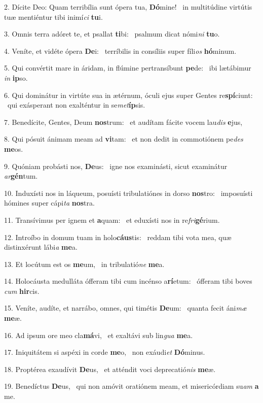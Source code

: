 2. Dícite Deo: Quam terribília sunt ópera tua, \textbf{Dó}mine! \ast\  in multitúdine virtútis tuæ mentiéntur tibi inimí\textit{ci} \textbf{tu}i.\

3. Omnis terra adóret te, et psallat \textbf{ti}bi: \ast\  psalmum dicat nómi\textit{ni} \textbf{tu}o.\

4. Veníte, et vidéte ópera \textbf{De}i: \ast\  terríbilis in consíliis super fíli\textit{os} \textbf{hó}minum.\

5. Qui convértit mare in áridam, in flúmine pertransíbunt \textbf{pe}de: \ast\  ibi lætábimur \textit{in} \textbf{ip}so.\

6. Qui dominátur in virtúte sua in ætérnum, óculi ejus super Gentes re\textbf{spí}ciunt: \ast\  qui exásperant non exalténtur in se\textit{met}\textbf{íp}sis.\

7. Benedícite, Gentes, Deum \textbf{nos}trum: \ast\  et audítam fácite vocem lau\textit{dis} \textbf{e}jus,\

8. Qui pósuit ánimam meam ad \textbf{vi}tam: \ast\  et non dedit in commotiónem pe\textit{des} \textbf{me}os.\

9. Quóniam probásti nos, \textbf{De}us: \ast\  igne nos examinásti, sicut examinátur \textit{ar}\textbf{gén}tum.\

10. Induxísti nos in láqueum, posuísti tribulatiónes in dorso \textbf{nos}tro: \ast\  imposuísti hómines super cápi\textit{ta} \textbf{nos}tra.\

11. Transívimus per ignem et \textbf{a}quam: \ast\  et eduxísti nos in re\textit{fri}\textbf{gé}rium.\

12. Introíbo in domum tuam in holo\textbf{cáus}tis: \ast\  reddam tibi vota mea, quæ distinxérunt lábi\textit{a} \textbf{me}a.\

13. Et locútum est os \textbf{me}um, \ast\  in tribulatió\textit{ne} \textbf{me}a.\

14. Holocáusta medulláta ófferam tibi cum incénso a\textbf{rí}etum: \ast\  ófferam tibi boves \textit{cum} \textbf{hir}cis.\

15. Veníte, audíte, et narrábo, omnes, qui timétis \textbf{De}um: \ast\  quanta fecit áni\textit{mæ} \textbf{me}æ.\

16. Ad ipsum ore meo cla\textbf{má}vi, \ast\  et exaltávi sub lin\textit{gua} \textbf{me}a.\

17. Iniquitátem si aspéxi in corde \textbf{me}o, \ast\  non exáudi\textit{et} \textbf{Dó}minus.\

18. Proptérea exaudívit \textbf{De}us, \ast\  et atténdit voci deprecatió\textit{nis} \textbf{me}æ.\

19. Benedíctus \textbf{De}us, \ast\  qui non amóvit oratiónem meam, et misericórdiam su\textit{am} \textbf{a} me.\

